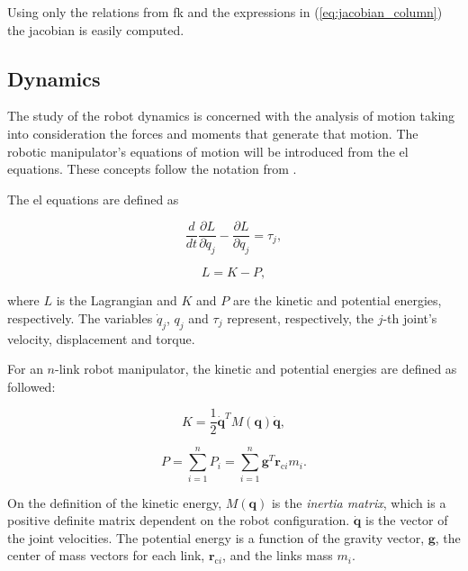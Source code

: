 Using only the relations from \gls{fk} and the expressions in (\ref{eq:jacobian_column}) the jacobian is easily computed.



\subsection{Dynamics}
\label{subsec:dynamics}

The study of the robot dynamics is concerned with the analysis of motion taking into consideration the forces and moments that generate that motion. The robotic manipulator's equations of motion will be introduced from the \gls{el} equations. These concepts follow the notation from \cite{Spong2005_robot_dynamics_control}.

The \gls{el} equations are defined as

\begin{equation}
    \label{eq:euler_lagrange_equations}
    \frac{d}{dt}\frac{\partial L}{\partial\dot{q}_j}-\frac{\partial L}{\partial q_j} = \tau_j ,
\end{equation}

\begin{equation}
    L = K - P,
\end{equation}

where $L$ is the Lagrangian and $K$ and $P$ are the kinetic and potential energies, respectively. The variables $\dot{q}_j$, $q_j$ and $\tau_j$ represent, respectively, the $j$-th joint's velocity, displacement and torque.

For an $n$-link robot manipulator, the kinetic and potential energies are defined as followed:

\begin{equation}
    \label{eq:kinetic_energy}
    K = \frac{1}{2}\dot{\boldsymbol{q}}^T M(\boldsymbol{q}) \dot{\boldsymbol{q}},
\end{equation}

\begin{equation}
    \label{eq:potential_energy}
    P = \sum^{n}_{i=1} P_i = \sum^{n}_{i=1} \boldsymbol{g}^T \boldsymbol{r}_{\text{c}i} m_i .
\end{equation}

On the definition of the kinetic energy, $M(\boldsymbol{q})$ is the \emph{inertia matrix}, which is a positive definite matrix dependent on the robot configuration. $\dot{\boldsymbol{q}}$ is the vector of the joint velocities.
The potential energy is a function of the gravity vector, $\boldsymbol{g}$, the center of mass vectors for each link, $\boldsymbol{r}_{\text{c}i}$, and the links mass $m_i$.

